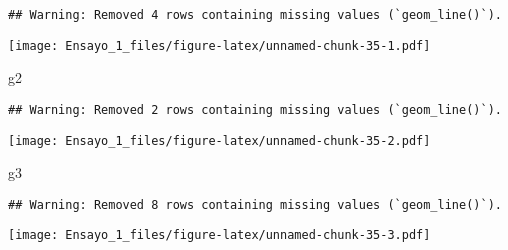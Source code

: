 \documentclass[
]{article}
\newenvironment{Shaded}{\begin{snugshade}}{\end{snugshade}}
\newcommand{\NormalTok}[1]{#1}
\begin{document}
\begin{verbatim}
## Warning: Removed 4 rows containing missing values (`geom_line()`).
\end{verbatim}

\texttt{[image: Ensayo\_1\_files/figure-latex/unnamed-chunk-35-1.pdf]}

\begin{Shaded}
\begin{Highlighting}[]
\NormalTok{g2}
\end{Highlighting}
\end{Shaded}

\begin{verbatim}
## Warning: Removed 2 rows containing missing values (`geom_line()`).
\end{verbatim}

\texttt{[image: Ensayo\_1\_files/figure-latex/unnamed-chunk-35-2.pdf]}

\begin{Shaded}
\begin{Highlighting}[]
\NormalTok{g3}
\end{Highlighting}
\end{Shaded}

\begin{verbatim}
## Warning: Removed 8 rows containing missing values (`geom_line()`).
\end{verbatim}

\texttt{[image: Ensayo\_1\_files/figure-latex/unnamed-chunk-35-3.pdf]}
\end{document}
